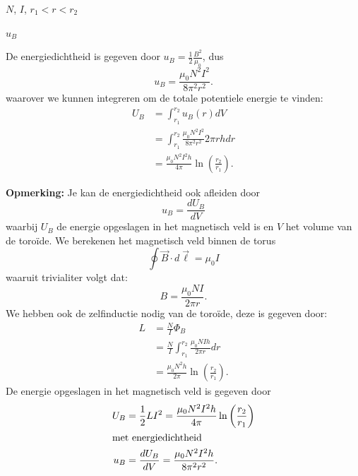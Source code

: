 \begin{description}[labelwidth=1.5cm, leftmargin=!]
    \item[Geg. :] $N$, $I$, $r_1 < r < r_2$
    \item[Gevr. :] $u_B$
    \item[Opl. :]
    De energiedichtheid is gegeven door $u_B = \frac{1}{2} \frac{B^2}{\mu_0}$, dus
    \begin{equation*}
        u_B = \frac{\mu_0 N^2 I^2}{8\pi^2 r^2}.
    \end{equation*}
    waarover we kunnen integreren om de totale potentiele energie te vinden:
    \begin{align*}
        U_B 
            &= \int_{r_1}^{r_2} u_B(r) dV \\
            &= \int_{r_1}^{r_2} \frac{\mu_0 N^2 I^2}{8\pi^2 r^2} 2\pi r h dr \\
            &= \frac{\mu_0 N^2 I^2 h}{4\pi} \ln \left(\frac{r_2}{r_1}\right).
    \end{align*}

    \vspace{0.3cm}
    \textbf{Opmerking:} 
        Je kan de energiedichtheid ook afleiden door 
        \begin{equation*}
            u_B = \frac{dU_B}{dV}
        \end{equation*} 
        waarbij $U_B$ de energie opgeslagen in het magnetisch veld is en $V$ het volume van de toroïde. We berekenen het magnetisch veld binnen de torus
        \begin{equation*}
            \oint \vec{B} \cdot d\vec{\ell} = \mu_0 I
        \end{equation*}
        waaruit trivialiter volgt dat:
        \begin{equation*}
            B = \frac{\mu_0 N I}{2\pi r}.
        \end{equation*}  
        We hebben ook de zelfinductie nodig van de toroïde, deze is gegeven door:
        \begin{align*}
            L 
                &= \frac{N}{I} \Phi_B \\
                &= \frac{N}{I} \int_{r_1}^{r_2} \frac{\mu_0 N I h }{2\pi r} dr \\
                &= \frac{\mu_0 N^2 h}{2\pi} \ln \left(\frac{r_2}{r_1}\right).
        \end{align*}
        De energie opgeslagen in het magnetisch veld is gegeven door
        \begin{align*}
            U_B &= \frac{1}{2}LI^2 = \frac{\mu_0 N^2  I^2 h}{4\pi} \ln \left(\frac{r_2}{r_1}\right) \\
        \intertext{met energiedichtheid}
            u_B &= \frac{dU_B}{dV} = \frac{\mu_0 N^2  I^2 h}{8\pi^2r^2}.
        \end{align*}

\end{description}

\vspace{1cm}